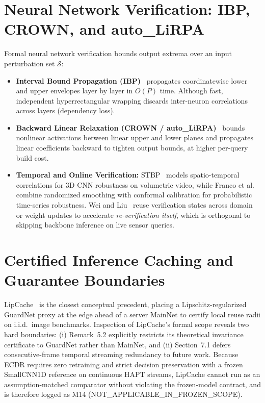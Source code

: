 \documentclass[11pt,oneside,a4paper]{report}
\newcommand{\code}[1]{{\small\upshape\ttfamily #1}}
\newcommand{\Sset}{\mathcal{S}}
\theoremstyle{remark}
\begin{document}
\section{Neural Network Verification: IBP, CROWN, and \code{auto\_LiRPA}}
Formal neural network verification bounds output extrema over an input perturbation set $\Sset$:
\begin{itemize}[leftmargin=1.5em]
  \item \textbf{Interval Bound Propagation (IBP)}~\cite{gowal2018ibp} propagates coordinatewise lower and upper envelopes layer by layer in $O(P)$ time. Although fast, independent hyperrectangular wrapping discards inter-neuron correlations across layers (dependency loss).
  \item \textbf{Backward Linear Relaxation (CROWN / \code{auto\_LiRPA})}~\cite{zhang2018crown,xu2020automatic,autolirpa2020} bounds nonlinear activations between linear upper and lower planes and propagates linear coefficients backward to tighten output bounds, at higher per-query build cost.
  \item \textbf{Temporal and Online Verification:} STBP~\cite{varghese2026stbp} models spatio-temporal correlations for 3D CNN robustness on volumetric video, while Franco et al.~\cite{franco2024conformalized} combine randomized smoothing with conformal calibration for probabilistic time-series robustness. Wei and Liu~\cite{wei2021online} reuse verification states across domain or weight updates to accelerate \emph{re-verification itself}, which is orthogonal to skipping backbone inference on live sensor queries.
\end{itemize}

\section{Certified Inference Caching and Guarantee Boundaries}
LipCache~\cite{xiang2026lipcache} is the closest conceptual precedent, placing a Lipschitz-regularized \code{GuardNet} proxy at the edge ahead of a server \code{MainNet} to certify local reuse radii on i.i.d.\ image benchmarks. Inspection of LipCache's formal scope reveals two hard boundaries: (i) Remark~5.2 explicitly restricts its theoretical invariance certificate to \code{GuardNet} rather than \code{MainNet}, and (ii) Section~7.1 defers consecutive-frame temporal streaming redundancy to future work. Because ECDR requires zero retraining and strict decision preservation with a frozen \code{SmallCNN1D} reference on continuous HAPT streams, LipCache cannot run as an assumption-matched comparator without violating the frozen-model contract, and is therefore logged as \code{M14} (\code{NOT\_APPLICABLE\_IN\_FROZEN\_SCOPE}).
\end{document}
